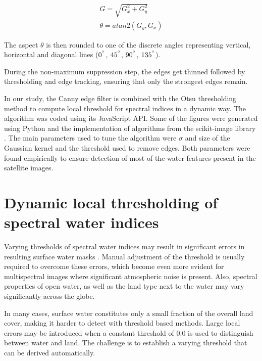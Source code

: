 \begin{gather}
G = \sqrt{G_x^2 + G_y^2} \\
\theta = atan2\left(G_y, G_x\right)
\end{gather}

The aspect $\theta$ is then rounded to one of the discrete angles representing vertical, horizontal and diagonal lines ($0^{\degree}$, $45^{\degree}$, $90^{\degree}$, $135^{\degree}$).

During the non-maximum suppression step, the edges get thinned followed by thresholding and edge tracking, ensuring that only the strongest edges remain.

In our study, the Canny edge filter is combined with the Otsu thresholding method to compute local threshold for spectral indices in a dynamic way. The algorithm was coded using its JavaScript API. Some of the figures were generated using Python and the implementation of algorithms from the scikit-image library \citet{van2014scikit}. The main parameters used to tune the algorithm were $\sigma$ and size of the Gaussian kernel and the threshold used to remove edges. Both parameters were found empirically to ensure detection of most of the water features present in the satellite images.

\section{Dynamic local thresholding of spectral water indices}


Varying thresholds of spectral water indices may result in significant errors in resulting surface water masks \citet{Yang2014}. Manual adjustment of the threshold is usually required to overcome these errors, which become even more evident for multispectral images where significant atmospheric noise is present. Also, spectral properties of open water, as well as the land type next to the water may vary significantly across the globe. 

In many cases, surface water constitutes only a small fraction of the overall land cover, making it harder to detect with threshold based methods. Large local errors may be introduced when a constant threshold of 0.0 is used to distinguish between water and land. The challenge is to establish a varying threshold that can be derived automatically. 

